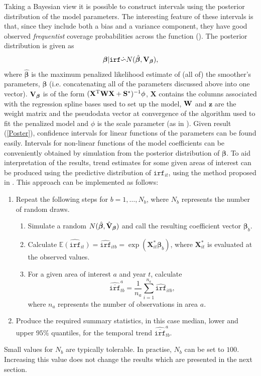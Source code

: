Taking a Bayesian view it is possible to construct intervals using the posterior distribution of the model parameters. The interesting feature of these intervals is that, since they include both a bias and a variance component, they have good observed \textit{frequentist} coverage probabilities across the function (\cite{Marra2011}). The posterior distribution is given as
\begin{equation}
\bm\beta|\texttt{irf} \dot{\backsim} N( \hat{\bm\beta}, {\bf V}_{\bm\beta} ),
\label{Poster}
\end{equation}
where $\hat{\bm\beta}$ is the maximum penalized likelihood estimate of (all of) the smoother's parameters, $\bm\beta$ (i.e. concatenating all of the parameters discussed above into one vector). ${\bf V}_{\bm\beta}$ is of the form $(\mathbf{X}^\text{T}{\bf W}\mathbf{X}+{\bf S}^*)^{-1}\phi$, $\mathbf{X}$ contains the columns associated with the regression spline bases used to set up the model, ${\bf W}$ and $\mathbf{z}$ are the weight matrix and the pseudodata vector at convergence of the algorithm used to fit the penalized model and $\phi$ is the scale parameter (as in ). Given result (\ref{Poster}), confidence intervals for linear functions of the parameters can be found easily. Intervals for non-linear functions of the model coefficients can be conveniently obtained by simulation from the posterior distribution of $\bm\beta$. To aid interpretation of the results, trend estimates for some given areas of interest can be produced using the predictive distribution of $\texttt{irf}_{it}$, using the method proposed in . This approach can be implemented as follows:

\begin{enumerate}
	\item Repeat the following steps for $b=1,\ldots,N_b$, where $N_b$ represents the number of random draws. 
	   \begin{enumerate}
	      \item Simulate a random $N(\hat{\bm\beta}, \hat{{\bf V}}_{\bm\beta} )$ and call the resulting coefficient vector $\bm\beta_b$.
	      \item Calculate $\widehat{\mathbb{E}(\texttt{irf}_{it})}=\widehat{\texttt{irf}}_{itb}=\exp(\mathbf{X}^*_{it}\bm\beta_b)$, where $\mathbf{X}^*_{it}$ is evaluated at the observed values. 
	      \item For a given area of interest $a$ and year $t$, calculate
	      $$\widehat{\overline{\texttt{irf}}}_{tb}^a=\frac{1}{n_a}\sum_{i=1}^{n_a} \widehat{\texttt{irf}}_{itb},$$
	      where $n_a$ represents the number of observations in area $a$.     
	   \end{enumerate}
	\item Produce the required summary statistics, in this case median, lower and upper $95\%$ quantiles, for the temporal trend $\widehat{\overline{\texttt{irf}}}_{tb}^a$.
\end{enumerate}
Small values for $N_b$ are typically tolerable. In practise, $N_b$ can be set to $100$. Increasing this value does not change the results which are presented in the next section.
 

